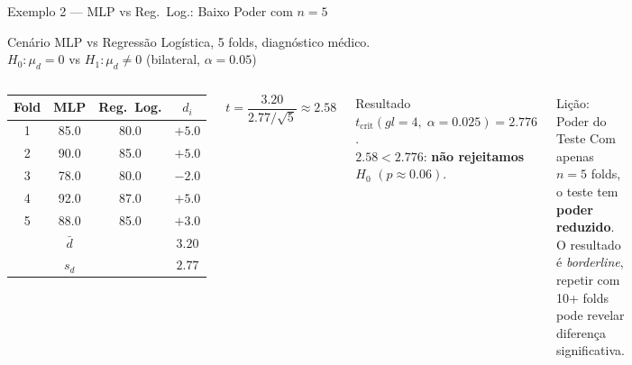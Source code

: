 \documentclass[aspectratio=169]{beamer}
\begin{document}
\begin{frame}[shrink=8]{Exemplo 2 — MLP vs Reg.\ Log.: Baixo Poder com $n=5$}
    \begin{block}{Cenário}
        \footnotesize MLP vs Regressão Logística, 5 folds, diagnóstico médico.\\
        $H_0: \mu_d = 0$ \; vs \; $H_1: \mu_d \neq 0$ \; (bilateral, $\alpha=0{.}05$)
    \end{block}
    \pause
    \begin{columns}
        \begin{center}\footnotesize
        \begin{tabular}{cccc}
        \toprule
        Fold & MLP & Reg.\ Log. & $d_i$ \\
        \midrule
        1 & 85{.}0 & 80{.}0 & $+5{.}0$ \\
        2 & 90{.}0 & 85{.}0 & $+5{.}0$ \\
        3 & 78{.}0 & 80{.}0 & $-2{.}0$ \\
        4 & 92{.}0 & 87{.}0 & $+5{.}0$ \\
        5 & 88{.}0 & 85{.}0 & $+3{.}0$ \\
        \midrule
        & $\bar{d}$ & & $3{.}20$ \\
        & $s_d$     & & $2{.}77$ \\
        \bottomrule
        \end{tabular}
        \end{center}
        \pause
        \[
          t = \frac{3{.}20}{2{.}77/\sqrt{5}} \approx 2{.}58
        \]
        \pause
        \begin{alertblock}{Resultado}
            \footnotesize $t_{\text{crit}}(gl=4,\;\alpha=0{.}025)=2{.}776$.\\
            $2{.}58 < 2{.}776$: \textbf{não rejeitamos $H_0$} $(p\approx0{.}06)$.
        \end{alertblock}
        \pause
        \begin{block}{Lição: Poder do Teste}
            \footnotesize Com apenas $n=5$ folds, o teste tem \textbf{poder reduzido}. O resultado é \textit{borderline}, repetir com 10+ folds pode revelar diferença significativa.
        \end{block}
    \end{columns}
\end{frame}
\end{document}

